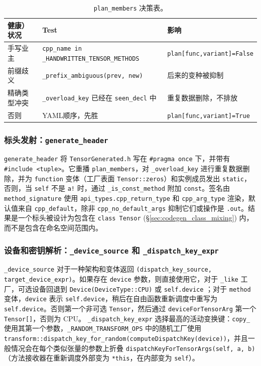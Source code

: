 \begin{table}[H]
\centering
\caption{\texttt{plan\_members} 决策表。}
\label{tab:planmembers}
\small
\begin{tabular}{lll}
\toprule
健康）状况 & Test & 影响 \\
\midrule
手写业主 & \texttt{cpp\_name in \_HANDWRITTEN\_TENSOR\_METHODS} & \texttt{plan[func,variant]=False} \\
前缀歧义 & \texttt{\_prefix\_ambiguous(prev, new)} & 后来的变种被抑制 \\
精确类型冲突 & \texttt{\_overload\_key} 已经在 \texttt{seen\_decl} 中 & 重复数据删除，不排放 \\
否则 & YAML顺序，先胜 & \texttt{plan[func,variant]=True} \\
\bottomrule
\end{tabular}
\end{table}

\subsubsection{标头发射：\texttt{generate\_header}}

\texttt{generate\_header} 将 \texttt{TensorGenerated.h} 写在 \texttt{\#pragma once} 下，并带有 \texttt{\#include <tuple>}。它重播 \texttt{plan\_members}，对 \texttt{\_overload\_key} 进行重复数据删除，并为 \texttt{function} 变体（工厂表面 \texttt{Tensor::zeros}）和实例成员发出 \texttt{static}，否则，当 \texttt{self} 不是 \texttt{a!} 时，通过 \texttt{\_is\_const\_method} 附加 \texttt{const}。签名由 \texttt{method\_signature} 使用 \texttt{api\_types.cpp\_return\_type} 和 \texttt{cpp\_arg\_type} 渲染，默认值来自 \texttt{cpp\_default}，除非 \texttt{cpp\_no\_default\_args} 抑制它们或操作是 \texttt{.out}。结果是一个标头被设计为包含在 \texttt{class Tensor} (\S\ref{sec:codegen_class_mixing}) 内，而不是包含在命名空间范围内。

\subsubsection{设备和密钥解析：\texttt{\_device\_source} 和 \texttt{\_dispatch\_key\_expr}}

\texttt{\_device\_source} 对于一种架构和变体返回 \texttt{(dispatch\_key\_source, target\_device\_expr)}。如果存在 \texttt{device} 参数，则直接使用它，对于 \texttt{\_like} 工厂，可选设备回退到 \texttt{Device(DeviceType::CPU)} 或 \texttt{self.device} ；对于 \texttt{method} 变体，\texttt{device} 表示 \texttt{self.device}，稍后在自由函数重新调度中重写为 \texttt{self.device}。否则第一个非可选 \texttt{Tensor}，然后通过 \texttt{deviceForTensorArg} 第一个 \texttt{Tensor[]}，否则为 CPU。 \texttt{\_dispatch\_key\_expr} 选择最高的活动变换键：\texttt{copy\_} 使用其第一个参数，\texttt{\_RANDOM\_TRANSFORM\_OPS} 中的随机工厂使用 \texttt{transform::dispatch\_key\_for\_random(computeDispatchKey(device))}，并且一般情况会在每个类似张量的参数上折叠 \texttt{dispatchKeyForTensorArgs(self, a, b)} （方法接收器在重新调度外部变为 \texttt{*this}，在内部变为 \texttt{self}）。

